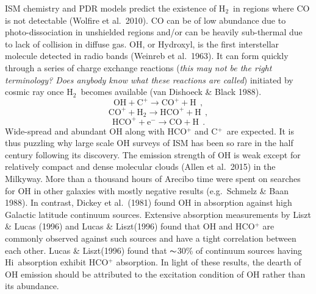 \documentclass[preprint]{emulateapj}
\def\hi{H{\sc i}}
\def\h2{H$_2$}
\def\cp{C$^+$}
\def\lp{\>\> .}
\def\lc{\>\> ,}
\begin{document}
ISM chemistry and PDR models predict the existence of \h2\ in regions where CO is not detectable (Wolfire et al.\ 2010).
 CO can be of  low abundance due to photo-dissociation  in unshielded regions and/or can be heavily sub-thermal due to lack of collision in diffuse gas.  OH, or Hydroxyl, is the first interstellar molecule detected in radio bands (Weinreb et al.\ 1963). It can form quickly through a series of charge exchange reactions ({\em this may not be the right terminology? Does anybody know what these reactions are called})  initiated by cosmic ray once \h2\ becomes available (van Dishoeck \& Black 1988). 
 \begin{equation}
\mathrm{OH+C^+\to CO^++ H}\label{eq1} \lc
\end{equation}
\begin{equation}
\mathrm{CO^++H_2 \to HCO^++ H}\label{eq2} \lc
\end{equation}
\begin{equation}
\mathrm{HCO^++e^-\to CO+ H}\label{eq3}  \lp
\end{equation}
Wide-spread and abundant OH along with HCO$^+$ and \cp\ are expected. It is thus puzzling why large scale OH surveys of ISM has been so rare  in the half century following its discovery.  The emission strength of OH is weak except for relatively compact and dense molecular clouds (Allen et al.\ 2015) in the Milkyway.  More than a thousand hours of Arecibo time were spent on searches for OH in other galaxies with mostly negative results (e.g.\ Schmelz \& Baan 1988). 
In contrast, Dickey et al.\ (1981) found OH in absorption against high Galactic latitude continuum sources. Extensive  absorption measurements by Liszt \& Lucas (1996) and Lucas \& Liszt(1996) found that OH and HCO$^{+}$ are commonly observed against such sources and have a tight correlation between each other. Lucas \& Liszt(1996) found that $\thicksim$30\% of continuum sources having \hi\ absorption exhibit HCO$^{+}$ absorption. In light of these results, the dearth of OH emission should be attributed to the excitation condition of OH rather than its abundance.
 
\end{document}
